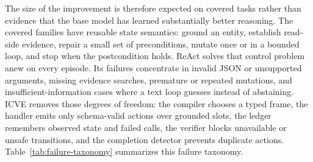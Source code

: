 \documentclass[11pt]{article}
\begin{document}
The size of the improvement is therefore expected on covered tasks rather than evidence
that the base model has learned substantially better reasoning. The covered families have
reusable state semantics: ground an entity, establish read-side evidence, repair a small
set of preconditions, mutate once or in a bounded loop, and stop when the postcondition
holds. ReAct solves that control problem anew on every episode. Its failures concentrate
in invalid JSON or unsupported arguments, missing evidence searches, premature or
repeated mutations, and insufficient-information cases where a text loop guesses instead
of abstaining. ICVE removes those degrees of freedom: the compiler chooses a typed frame,
the handler emits only schema-valid actions over grounded slots, the ledger remembers
observed state and failed calls, the verifier blocks unavailable or unsafe transitions,
and the completion detector prevents duplicate actions. Table~\ref{tab:failure-taxonomy}
summarizes this failure taxonomy.
\end{document}
